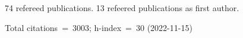 74 refereed publications. 13 refeered publications as first author.

Total citations~=~3003; h-index~=~30 (2022-11-15)